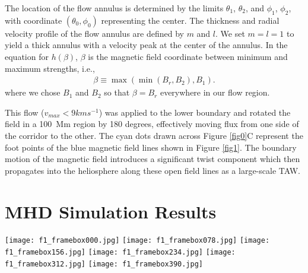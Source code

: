 \documentclass[preprint]{aastex62}
\begin{document}
\noindent The location of the flow annulus is determined by the limits $\theta_1$, $\theta_2$, 
and $\phi_1$, $\phi_2$, with coordinate $\left( \theta_0,\phi_0 \right)$ representing the center. 
The thickness and radial velocity profile of the flow annulus are defined by $m$ 
and $l$. We set $m = l = 1$ to yield a thick annulus with a velocity 
peak at the center of the annulus.  In the equation for $h(\beta)$, 
$\beta$ is the magnetic field coordinate between minimum and maximum 
strengths, i.e., 
\begin{eqnarray}
\beta \equiv \max \left( \min \left( B_{r}, B_{2} \right) , B_{1}\right).
\end{eqnarray}
where we chose $B_{1}$ and $B_{2} $ so that $\beta = B_{r}$ everywhere in our flow region.  

This flow ($v_{max} < 9 km s^{-1}$) was applied to the lower boundary and rotated the field in a
100~Mm region by 180 degrees, effectively moving flux from one side
of the corridor to the other. The cyan dots drawn across Figure \ref{fig0}C represent the foot points of the 
blue magnetic field lines shown in Figure \ref{fig1}. The boundary motion of the magnetic
field introduces a significant twist component which
then propagates into the heliosphere along these open field lines as
a large-scale TAW. 


\section{MHD Simulation Results}
\label{sxn_sim}


\begin{figure*}
	\texttt{[image: f1\_framebox000.jpg]}
	\texttt{[image: f1\_framebox078.jpg]}
	\texttt{[image: f1\_framebox156.jpg]}
	\texttt{[image: f1\_framebox234.jpg]}
	\texttt{[image: f1\_framebox312.jpg]}
	\texttt{[image: f1\_framebox390.jpg]}
	\caption{Six panels showing the evolution of streamer blobs
	in the HCS and the TAW. The black magnetic field lines show
	the interconnected blobs emanating from the top of the
	helmet streamer (shown in green). The blue field lines drawn
	from the surface show the S-Web arc and the TAW generated
	by the rotational photospheric driver. Four stationary
	observers and their magnetic field line connectivities are plotted in magenta,
	yellow, red, and light blue. \\ (An animation of this figure
	is available.)}
	\label{fig1}
\end{figure*}
\end{document}
